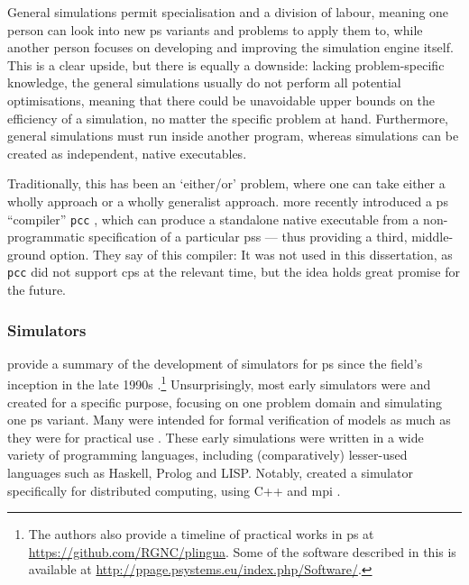 General simulations permit specialisation and a division of labour, meaning one person can look into new \gls{ps} variants and problems to apply them to, while another person focuses on developing and improving the simulation engine itself.  This is a clear upside, but there is equally a downside: lacking problem-specific knowledge, the general simulations usually do not perform all potential optimisations, meaning that there could be unavoidable upper bounds on the efficiency of a simulation, no matter the specific problem at hand.  Furthermore, general simulations must run inside another program, whereas \adhoc{} simulations can be created as independent, native executables.

Traditionally, this has been an `either/or' problem, where one can take either a wholly \adhoc{} approach or a wholly generalist approach.  \citeauthor{Perez-Hurtado2019} more recently introduced a \gls{ps} ``compiler'' \texttt{pcc} \cite{Perez-Hurtado2019}, which can produce a standalone native executable from a non-programmatic specification of a particular \glspl{ps} --- thus providing a third, middle-ground option.  They say of this compiler:   It was not used in this dissertation, as \texttt{pcc} did not support \gls{cps} at the relevant time, but the idea holds great promise for the future.

\subsubsection{\label{sec:lr:simulators} Simulators}

\citeauthor{Valencia-Cabrera2019} provide a summary of the development of simulators for \Gls{ps} since the field's inception in the late 1990s \cite{Valencia-Cabrera2019}.\footnote{The authors also provide a timeline of practical works in \gls{ps} at \url{https://github.com/RGNC/plingua}.  Some of the software described in this  is available at \url{http://ppage.psystems.eu/index.php/Software/}.}  Unsurprisingly, most early simulators were \adhoc{} and created for a specific purpose, focusing on one problem domain and simulating one \gls{ps} variant.  Many were intended for formal verification of models as much as they were for practical use \cite{Gutierrez-Naranjo2007}.  These early simulations were written in a wide variety of programming languages, including (comparatively) lesser-used languages such as Haskell, Prolog and LISP.  Notably, \citeauthor{Ciobanu2004} created a simulator specifically for distributed computing, using C++ and \gls{mpi} \cite{Ciobanu2004}.

